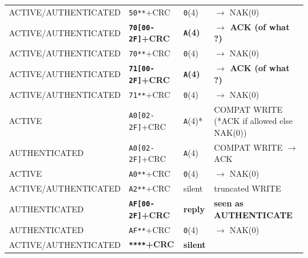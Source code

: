 \begin{longtable}{l l l l}
ACTIVE/AUTHENTICATED & \texttt{50**}+CRC                   & \texttt{0}(4)   & $\rightarrow$ NAK(0)                        \\
ACTIVE/AUTHENTICATED & \textbf{\texttt{70[00-2F]}+CRC}     & \textbf{\texttt{A}(4)}   &  \textbf{$\rightarrow$ ACK (of what ?)} \\
ACTIVE/AUTHENTICATED & \texttt{70**}+CRC                   & \texttt{0}(4)   & $\rightarrow$ NAK(0)                        \\
ACTIVE/AUTHENTICATED & \textbf{\texttt{71[00-2F]}+CRC}     & \textbf{\texttt{A}(4)}   &  \textbf{$\rightarrow$ ACK (of what ?)} \\
ACTIVE/AUTHENTICATED & \texttt{71**}+CRC                   & \texttt{0}(4)   & $\rightarrow$ NAK(0)                        \\
ACTIVE               & \texttt{A0[02-2F]}+CRC              & \texttt{A}(4)*  & COMPAT WRITE (*ACK if allowed else NAK(0))  \\
AUTHENTICATED        & \texttt{A0[02-2F]}+CRC              & \texttt{A}(4)   & COMPAT WRITE $\rightarrow$ ACK              \\
ACTIVE               & \texttt{A0**}+CRC                   & \texttt{0}(4)   & $\rightarrow$ NAK(0)                        \\
ACTIVE/AUTHENTICATED & \texttt{A2**}+CRC                   & silent          & truncated WRITE                             \\
AUTHENTICATED        & \textbf{\texttt{AF[00-2F]}+CRC}     & \textbf{reply}  & \textbf{seen as AUTHENTICATE}               \\
AUTHENTICATED        & \texttt{AF**}+CRC                   & \texttt{0}(4)   & $\rightarrow$ NAK(0)                        \\
ACTIVE/AUTHENTICATED & \textbf{\texttt{****}+CRC}          & \textbf{silent} &                                             \\
\hline
\end{longtable}
